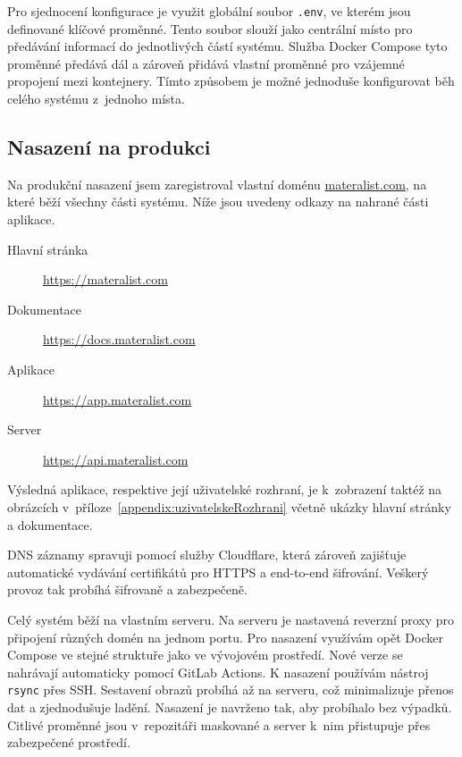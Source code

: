Pro sjednocení konfigurace je využit globální soubor \texttt{.env}, ve kterém jsou definované klíčové proměnné. 
Tento soubor slouží jako centrální místo pro předávání informací do jednotlivých částí systému. 
Služba Docker Compose tyto proměnné předává dál a zároveň přidává vlastní proměnné pro vzájemné propojení mezi kontejnery. 
Tímto způsobem je možné jednoduše konfigurovat běh celého systému z~jednoho místa.

\subsection{Nasazení na produkci}

Na produkční nasazení jsem zaregistroval vlastní doménu \href{https://materalist.com}{materalist.com}, na které běží všechny části systému.  
Níže jsou uvedeny odkazy na nahrané části aplikace.

\begin{description}
    \item[Hlavní stránka] \href{https://materalist.com}{https://materalist.com}
    \item[Dokumentace] \href{https://docs.materalist.com}{https://docs.materalist.com}
    \item[Aplikace] \href{https://app.materalist.com}{https://app.materalist.com}
    \item[Server] \href{https://api.materalist.com}{https://api.materalist.com}
\end{description}

Výsledná aplikace, respektive její uživatelské rozhraní, je k~zobrazení taktéž na obrázcích v~příloze~\ref{appendix:uzivatelskeRozhrani} včetně ukázky hlavní stránky a dokumentace.

DNS záznamy spravuji pomocí služby Cloudflare, která zároveň zajišťuje automatické vydávání certifikátů pro HTTPS a end-to-end šifrování. 
Veškerý provoz tak probíhá šifrovaně a zabezpečeně.

Celý systém běží na vlastním serveru. 
Na serveru je nastavená reverzní proxy pro připojení různých domén na jednom portu.
Pro nasazení využívám opět Docker Compose ve stejné struktuře jako ve vývojovém prostředí.
Nové verze se nahrávají automaticky pomocí GitLab Actions. 
K nasazení používám nástroj \texttt{rsync} přes SSH. 
Sestavení obrazů probíhá až na serveru, což minimalizuje přenos dat a zjednodušuje ladění. 
Nasazení je navrženo tak, aby probíhalo bez výpadků. 
Citlivé proměnné jsou v~repozitáři maskované a server k~nim přistupuje přes zabezpečené prostředí.

